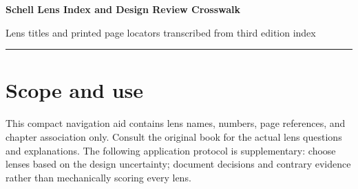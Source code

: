 \documentclass[11pt]{article}
\begin{document}
{\huge\bfseries\color{suiteblue} Schell Lens Index and Design Review Crosswalk}\par
\vspace{0.15in}
{\normalsize\color{suitegray} Lens titles and printed page locators transcribed from third edition index}\par
\vspace{0.15in}\hrule\vspace{0.15in}

\section{Scope and use}
This compact navigation aid contains lens names, numbers, page references, and chapter association only. Consult the original book for the actual lens questions and explanations. The following application protocol is supplementary: choose lenses based on the design uncertainty; document decisions and contrary evidence rather than mechanically scoring every lens.
\end{document}
